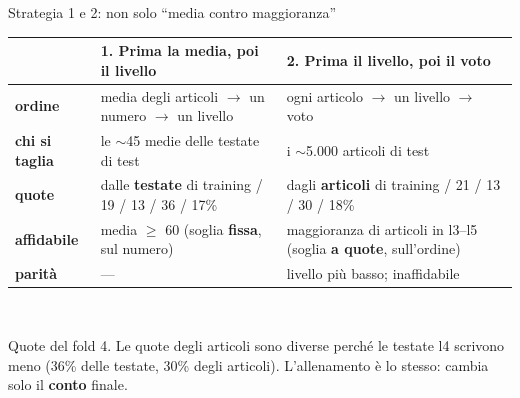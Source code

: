 \documentclass[aspectratio=169]{beamer}
\newcommand{\hl}[1]{\textbf{#1}}
\begin{document}
\begin{frame}{Strategia 1 e 2: non solo ``media contro maggioranza''}
  \centering\small
  \begin{tabular}{>{\raggedright\arraybackslash}p{}>{\raggedright\arraybackslash}p{}>{\raggedright\arraybackslash}p{}}
    \toprule
    & \textbf{1. Prima la media, poi il livello} & \textbf{2. Prima il livello, poi il voto} \\
    \midrule
    \hl{ordine} & media degli articoli $\to$ un numero $\to$ un livello & ogni articolo $\to$ un livello $\to$ voto \\
    \addlinespace
    \hl{chi si taglia} & le $\sim$45 medie delle testate di test & i $\sim$5.000 articoli di test \\
    \addlinespace
    \hl{quote} & dalle \hl{testate} di training \newline 16 / 19 / 13 / 36 / 17\% & dagli \hl{articoli} di training \newline
    18 / 21 / 13 / 30 / 18\% \\
    \addlinespace
    \hl{affidabile} & media $\ge$ 60 \newline (soglia \hl{fissa}, sul numero) & maggioranza di articoli in l3--l5 \newline
    (soglia \hl{a quote}, sull'ordine) \\
    \addlinespace
    \hl{parit\`a} & --- & livello pi\`u basso; inaffidabile \\
    \bottomrule
  \end{tabular}\\[0.8em]
  \raggedright
  Quote del fold 4. Le quote degli articoli sono diverse perch\'e le testate l4 scrivono meno (36\% delle testate, 30\% degli
  articoli). L'allenamento \`e lo stesso: cambia solo il \hl{conto} finale.
\end{frame}
\end{document}
